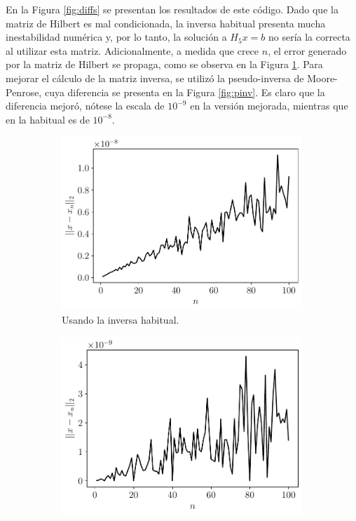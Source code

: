 \documentclass[fleqn]{article}
\begin{document}
En la Figura \ref{fig:diffs} se presentan los resultados de este código. Dado que la matriz de Hilbert es mal condicionada, la inversa habitual presenta mucha inestabilidad numérica y, por lo tanto, la solución a $H_5x=b$ no sería la correcta al utilizar esta matriz. Adicionalmente, a medida que crece $n$, el error generado por la matriz de Hilbert se propaga, como se observa en la Figura \ref{fig:inv}. Para mejorar el cálculo de la matriz inversa, se utilizó la pseudo-inversa de Moore-Penrose, cuya diferencia se presenta en la Figura \ref{fig:pinv}. Es claro que la diferencia mejoró, nótese la escala de $10^{-9}$ en la versión mejorada, mientras que en la habitual es de $10^{-8}$.

\begin{figure}[H]
    \centering
    \begin{subfigure}[b]{0.45\textwidth}
        \centering
        \includegraphics[width=\textwidth]{src/figs/Punto3_og.pdf}
        \caption{Usando la inversa habitual.}
        \label{fig:inv}
    \end{subfigure}
    \begin{subfigure}[b]{0.45\textwidth}  
        \centering 
        \includegraphics[width=\textwidth]{src/figs/Punto3_mejorada.pdf}

\end{subfigure}
\end{figure}
\end{document}
